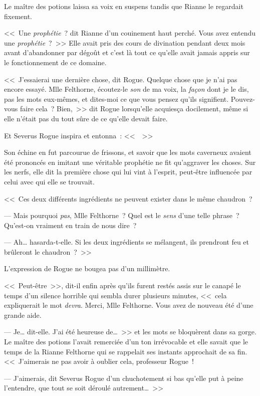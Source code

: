 Le maître des potions laissa sa voix en suspens tandis que Rianne le regardait fixement.

<<~Une \emph{prophétie}~? dit Rianne d'un couinement haut perché. Vous avez entendu une \emph{prophétie}~?~>> Elle avait pris des cours de divination pendant deux mois avant d'abandonner par dégoût et c'est là tout ce qu'elle avait jamais appris sur le fonctionnement de ce domaine.

<<~J'essaierai une dernière chose, dit Rogue. Quelque chose que je n'ai pas encore essayé. Mlle Felthorne, écoutez-le \emph{son} de ma voix, la \emph{façon} dont je le dis, pas les mots eux-mêmes, et dites-moi ce que vous pensez qu'ils signifient. Pouvez-vous faire cela~? Bien,~>> dit Rogue lorsqu'elle acquiesça docilement, même si elle n'était pas du tout sûre de ce qu'elle devait faire.

Et Severus Rogue inspira et entonna~: <<~~>>

Son échine en fut parcourue de frissons, et savoir que les mots caverneux avaient été prononcés en imitant une véritable prophétie ne fit qu'aggraver les choses. Sur les nerfs, elle dit la première chose qui lui vint à l'esprit, peut-être influencée par celui avec qui elle se trouvait.

<<~Ces deux différents ingrédients ne peuvent exister dans le même chaudron~?

--- Mais pourquoi \emph{pas}, Mlle Felthorne~? Quel est le \emph{sens} d'une telle phrase~? Qu'est-on vraiment en train de nous dire~?

--- Ah… hasarda-t-elle. Si les deux ingrédients se mélangent, ils prendront feu et brûleront le chaudron~?~>>

L'expression de Rogue ne bougea pas d'un millimètre.

<<~Peut-être~>>, dit-il enfin après qu'ils furent restés assis sur le canapé le temps d'un silence horrible qui sembla durer plusieurs minutes, <<~cela expliquerait le mot \emph{devra}. Merci, Mlle Felthorne. Vous avez de nouveau été d'une grande aide.

--- Je… dit-elle. J'ai été heureuse de…~>> et les mots se bloquèrent dans sa gorge. Le maître des potions l'avait remerciée d'un ton irrévocable et elle savait que le temps de la Rianne Felthorne qui se rappelait ses instants approchait de sa fin. <<~J'aimerais ne pas avoir à oublier cela, professeur Rogue~!

--- J'aimerais, dit Severus Rogue d'un chuchotement si bas qu'elle put à peine l'entendre, que tout se soit déroulé autrement…~>>

